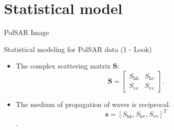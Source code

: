 \documentclass[10pt]{beamer}
\begin{document}
\section{Statistical model}
\begin{frame}[fragile]{PolSAR Image}
\begin{alertblock}{Statistical modeling for PolSAR data (1 - Look)}
\begin{itemize}
\item The complex scattering matrix $\mathbf{S}$:
\begin{equation}
\mathbf{S} = \left[
\begin{array}{cc}
	S_\text{hh}   & S_\text{hv}   \\
	S_\text{vv}   & S_\text{vv}   
\end{array}
\right].
\end{equation}\label{eq_01}
\item The medium of propagation of waves is reciprocal.
$$\mathbf{s}=[S_\text{hh},S_\text{hv},S_{\text{vv}}]^T$$.
\end{itemize}
\end{alertblock}
\end{frame}
\end{document}
